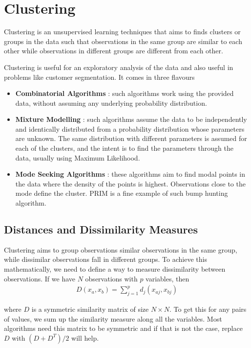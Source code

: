 \documentclass[../statistical_learning_notes.tex]{subfiles}
\begin{document}
    \chapter{Clustering}
    Clustering is an unsupervised learning techniques that aims to finds clusters or groups in the data such that observations in the same group are similar to each other while observations in different groups are different from each other.\newline

    Clustering is useful for an exploratory analysis of the data and also useful in problems like customer segmentation. It comes in three flavours
    \begin{itemize}
        \item \textbf{Combinatorial Algorithms} : such algorithms work using the provided data, without assuming any underlying probability distribution.
        \item \textbf{Mixture Modelling} : such algorithms assume the data to be independently and identically distributed from a probability distribution whose parameters are unknown. The same distribution with different parameters is assumed for each of the clusters, and the intent is to find the parameters through the data, usually using Maximum Likelihood.
        \item \textbf{Mode Seeking Algorithms} : these algorithms aim to find modal points in the data where the density of the points is highest. Observations close to the mode define the cluster. PRIM is a fine example of such bump hunting algorithm.
    \end{itemize}

    \section{Distances and Dissimilarity Measures}
    Clustering aims to group observations similar observations in the same group, while dissimilar observations fall in different groups. To achieve this mathematically, we need to define a way to measure dissimilarity between observations. If we have $N$ observations with $p$ variables, then
    \begin{align*}
        D(x_{a}, x_{b}) = \sum_{j=1}^{p}d_{j}(x_{aj}, x_{bj})
    \end{align*}

    where $D$ is a symmetric similarity matrix of size $N \times N$. To get this for any pairs of values, we sum up the similarity measure along all the variables. Most algorithms need this matrix to be symmetric and if that is not the case, replace $D$ with $(D + D^{T})/2$ will help.\newline
\end{document}
